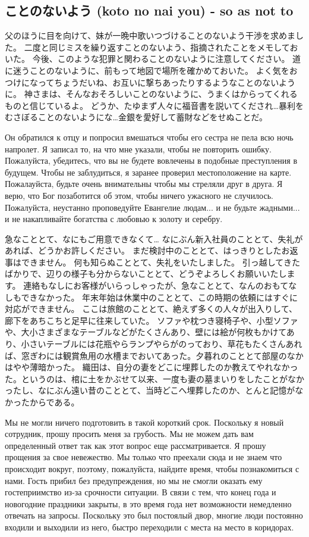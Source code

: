 \subsection{ことのないよう (koto no nai you) - so as not to}

父のほうに目を向けて、妹が一晩中歌いつづけることのないよう干渉を求めました。
二度と同じミスを繰り返すことのないよう、指摘されたことをメモしておいた。
今後、このような犯罪と関わることのないように注意してください。
道に迷うことのないように、前もって地図で場所を確かめておいた。
よく気をおつけになってちょうだいね、お互いに撃ちあったりするようなことのないように。
神さまは、そんなおそろしいことのないように、うまくはからってくれるものと信じているよ。
どうか、たゆまず人々に福音書を説いてくだされ…暴利をむさぼることのないようにな…金銀を愛好して蓄財などをせぬことだ。

Он обратился к отцу и попросил вмешаться чтобы его сестра не пела всю ночь напролет.
Я записал то, на что мне указали, чтобы не повторить ошибку.
Пожалуйста, убедитесь, что вы не будете вовлечены в подобные преступления в будущем.
Чтобы не заблудиться, я заранее проверил местоположение на карте.
Пожалауйста, будьте очень внимательны чтобы мы стреляли друг в друга.
Я верю, что Бог позаботится об этом, чтобы ничего ужасного не случилось.
Пожалуйста, неустанно проповедуйте Евангелие людам... и не будьте жадными... и не накапливайте богатства с любовью к золоту и серебру.

急なこととて、なにもご用意できなくて…
なにぶん新入社員のこととて、失礼があれば、どうかお許しください。
まだ検討中のこととて、はっきりとしたお返事はできません。
何も知らぬこととて、失礼をいたしました。
引っ越してきたばかりで、辺りの様子も分からないこととて、どうぞよろしくお願いいたします。
連絡もなしにお客様がいらっしゃったが、急なこととて、なんのおもてなしもできなかった。
年末年始は休業中のこととて、この時期の依頼にはすぐに対応ができません。
ここは旅館のこととて、絶えず多くの人々が出入りして、廊下をあちこちと足早に往来していた。
ソファや枕つき寝椅子や、小型ソファや、大小さまざまなテーブルなどがたくさんあり、壁には絵が何枚もかけてあり、小さいテーブルには花瓶やらランプやらがのっており、草花もたくさんあれば、窓ぎわには観賞魚用の水槽までおいてあった。夕暮れのこととて部屋のなかはやや薄暗かった。
織田は、自分の妻をどこに埋葬したのか教えてやれなかった。というのは、棺に土をかぶせて以来、一度も妻の墓まいりをしたことがなかったし、なにぶん遠い昔のこととて、当時どこへ埋葬したのか、とんと記憶がなかったからである。

Мы не могли ничего подготовить в такой короткий срок.
Поскольку я новый сотрудник, прошу просить меня за грубость.
Мы не можем дать вам определенный ответ так как этот вопрос еще рассматривается.
Я прошу прощения за свое невежество.
Мы только что преехали сюда и не знаем что происходит вокруг, поэтому, пожалуйста, найдите время, чтобы познакомиться с нами.
Гость прибил без предупреждения, но мы не смогли оказать ему гостеприимство из-за срочности ситуации.
В связи с тем, что конец года и новогодние праздники закрыты, в это время года нет возможности немедленно отвечать на запросы.
Поскольку это был постоялый двор, многие люди постоянно входили и выходили из него, быстро переходили с места на место в коридорах. 